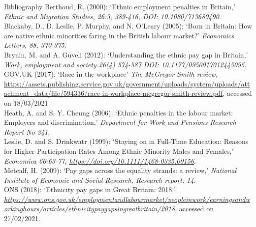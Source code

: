 \documentclass[aspectratio=169,12pt]{beamer}
\begin{document}
\begin{frame}[allowframebreaks]{Bibliography}
\footnotesize{
Berthoud, R. (2000): `Ethnic employment penalties in Britain,' \textit{Ethnic and Migration
Studies, 26:3, 389-416, DOI: 10.1080/713680490}.
\bigskip
\\Blackaby, D., D. Leslie, P. Murphy, and N. O'Leary (2005): `Born in Britain: How are native ethnic minorities faring in the British labour market?' \textit{Economics Letters, 88, 370-375}.
\bigskip
\\Brynin, M. and A. Guveli (2012): `Understanding the ethnic pay gap in Britain,' \textit{Work, employment and society 26(4) 574-587 DOI: 10.1177/0950017012445095}.
\bigskip
\\GOV.UK (2017): \enquote*{Race in the workplace} \textit{The McGregor Smith review,} \url{https://assets.publishing.service.gov.uk/government/uploads/system/uploads/attachment_data/file/594336/race-in-workplace-mcgregor-smith-review.pdf}, accessed on 18/03/2021
\bigskip
\\Heath, A. and S. Y. Cheung (2006): `Ethnic penalties in the labour market: Employers and discrimination,' \textit{Department for Work and Pensions Research Report No 341.}
\bigskip
\\Leslie, D. and S. Drinkwatr (1999): `Staying on in Full-Time Education: Reasons for Higher Participation Rates Among Ethnic Minority Males and Females,' \textit{Economica 66:63-77, \url{https://doi.org/10.1111/1468-0335.00156}}.
\bigskip
\\Metcalf, H. (2009): `Pay gaps across the equality strands: a review,' \textit{National Institute of Economic and Social Research, Research report: 14}.
\vspace{5pt}
\\ONS (2018): `Ethnicity pay gaps in Great Britain: 2018,' \textit{\url{https://www.ons.gov.uk/employmentandlabourmarket/peopleinwork/earningsandworkinghours/articles/ethnicitypaygapsingreatbritain/2018}}, accessed on 27/02/2021.
}
\end{frame}
\end{document}
